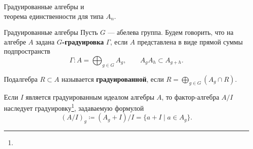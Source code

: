 \documentclass[12pt,aspectratio=169]{beamer}
\newcommand{\term}[1]{{\color{MainRed}\bfseries #1}}
\newcommand{\sourcefootnote}[1]{\footnote{\slidecite{#1}}}
\begin{document}
\begin{frame}[plain]
    \vfill
    \begin{center}
        {Градуированные алгебры и\\теорема единственности для типа $A_n$.\par}
    \end{center}
    \vfill
\end{frame}

\begin{frame}[t]{Градуированные алгебры}
    \small
    Пусть $G$ --- абелева группа. Будем говорить, что на алгебре $A$ задана
    \term{$G$-градуировка} $\Gamma$, если $A$ представлена в виде прямой суммы
    подпространств
    \[
        \Gamma\colon A=\bigoplus_{g\in G}A_g,
        \qquad A_gA_h\subset A_{g+h}.
    \]

    \medskip

    Подалгебра $R\subset A$ называется \term{градуированной}, если
    $R=\bigoplus_{g\in G}(A_g\cap R)$.

    \medskip

    Если $I$ является градуированным идеалом алгебры $A$, то фактор-алгебра $A/I$
    наследует градуировку\sourcefootnote{moody95}, задаваемую формулой
    \[
        (A/I)_g\coloneq (A_g+I)/I = \{a+I \mid a\in A_g\}.
    \]
\end{frame}

\end{document}
